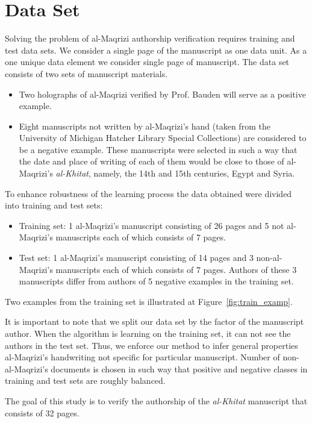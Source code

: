 \documentclass[conference,a4paper]{ieeetran}
\begin{document}
\section{Data Set}
\label{sec:the_data}

Solving the problem of al-Maqrizi authorship verification requires training and test data sets. 
We consider a single page of the manuscript as one data unit.
As a one unique data element we consider single page of manuscript. The data set consists of two sets of manuscript materials.
\begin{itemize}
	\item Two holographs of al-Maqrizi verified by Prof. Bauden will serve as a positive example.
	\item Eight manuscripts not written by al-Maqrizi's hand  (taken from the University of Michigan Hatcher Library Special Collections) are considered to be a negative example. These manuscripts were selected in such a way that the date and place of writing of each of them would be close to those of al-Maqrizi's  \textit{al-Khitat}, namely, the 14th and 15th centuries, Egypt and Syria.
\end{itemize}

To enhance robustness of the learning process the data obtained were divided into training and test sets:
\begin{itemize}
	\item Training set: 1 al-Maqrizi's manuscript consisting of 26 pages and 5 not al-Maqrizi's manuscripts each of which consists of 7 pages.
	\item Test set: 1 al-Maqrizi's manuscript consisting of 14 pages and 3 non-al-Maqrizi's manuscripts each of which consists of 7 pages. Authors of these 3 manuscripts differ from authors of 5 negative examples in the training set.   
\end{itemize}

Two examples from the training set is illustrated at Figure~\ref{fig:train_examp}. 

It is important to note that we split our data set by the factor of the manuscript author. When the algorithm is learning on the training set, it can not see the authors in the test set. Thus, we enforce our method to infer general properties al-Maqrizi's handwriting not specific for particular manuscript. Number of non-al-Maqrizi's documents is chosen in such way that positive and negative classes in training and test sets are roughly balanced.

The goal of this study is to verify the authorship of the \textit{al-Khitat} manuscript that consists of 32 pages.
\end{document}
